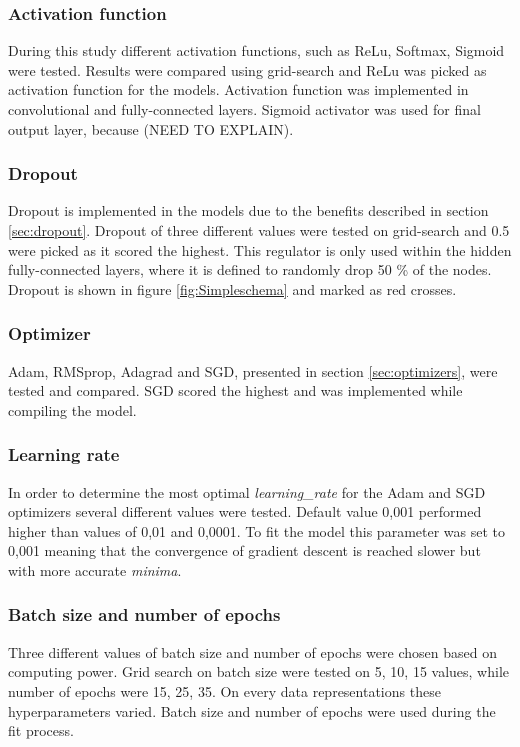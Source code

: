 \subsubsection{Activation function}
During this study different activation functions, such as ReLu, Softmax, Sigmoid were tested. Results were compared using grid-search and ReLu was picked as activation function for the models. Activation function was implemented in convolutional and fully-connected layers. Sigmoid activator was used for final output layer, because (NEED TO EXPLAIN).

\subsubsection{Dropout}
Dropout is implemented in the models due to the benefits described in section \ref{sec:dropout}. Dropout of three different values were tested on grid-search and 0.5 were picked as it scored the highest. This regulator is only used within the hidden fully-connected layers, where it is defined to randomly drop 50 \% of the nodes. Dropout is shown in figure \ref{fig:Simpleschema} and marked as red crosses. 

\subsubsection{Optimizer}
Adam, RMSprop, Adagrad and SGD, presented in section \ref{sec:optimizers}, were tested and compared. SGD scored the highest and was implemented while compiling the model.

\subsubsection{Learning rate}
In order to determine the most optimal \textit{learning\_rate} for the Adam  and SGD optimizers several different values were tested. Default value 0,001 performed higher than values of 0,01 and 0,0001. To fit the model this parameter was set to 0,001 meaning that the convergence of gradient descent is reached slower but with more accurate \textit{minima}. 

\subsubsection{Batch size and number of epochs}
Three different values of batch size and number of epochs were chosen based on computing power. Grid search on batch size were tested on 5, 10, 15 values, while number of epochs were 15, 25, 35. On every data representations these hyperparameters varied. Batch size and number of epochs were used during the fit process.

